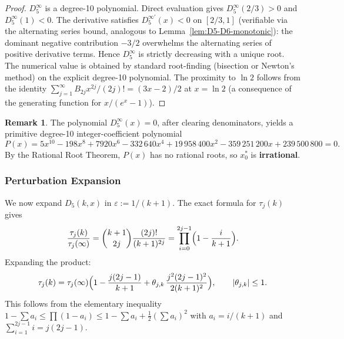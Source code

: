 \documentclass[12pt,a4paper]{article}
\theoremstyle{plain}
\theoremstyle{definition}
\newtheorem{remark}[theorem]{Remark}
\begin{document}
\begin{proof}
  $D_5^\infty$ is a degree-10 polynomial.  Direct evaluation gives
  $D_5^\infty(2/3) > 0$ and $D_5^\infty(1) < 0$.  The derivative
  satisfies $D_5^{\infty\prime}(x) < 0$ on $[2/3,1]$ (verifiable via
  the alternating series bound, analogous to Lemma~\ref{lem:D5-D6-monotonic}):
  the dominant negative contribution $-3/2$ overwhelms the alternating
  series of positive derivative terms.  Hence $D_5^\infty$ is strictly
  decreasing with a unique root.
  The numerical value is obtained by standard root-finding (bisection or
  Newton's method) on the explicit degree-10 polynomial.
  The proximity to $\ln 2$ follows from the identity
  $\sum_{j=1}^\infty B_{2j}x^{2j}/(2j)! = (3x-2)/2$
  at $x = \ln 2$ (a consequence of the generating function for
  $x/(e^x-1)$).
\end{proof}

\begin{remark}
  The polynomial $D_5^\infty(x) = 0$, after clearing denominators, yields
  a primitive degree-10 integer-coefficient polynomial
  \[
    P(x) = 5x^{10} - 198x^8 + 7920x^6 - 332\,640x^4
            + 19\,958\,400x^2 - 359\,251\,200x + 239\,500\,800 = 0.
  \]
  By the Rational Root Theorem, $P(x)$ has no rational roots, so
  $x_0^*$ is \textbf{irrational}.
\end{remark}

\subsubsection{Perturbation Expansion}
\label{sec:perturb}

We now expand $D_5(k,x)$ in $\varepsilon := 1/(k+1)$.  The exact formula
for $\tau_j(k)$ gives
\[
  \frac{\tau_j(k)}{\tau_j(\infty)}
  = \binom{k+1}{2j}\frac{(2j)!}{(k+1)^{2j}}
  = \prod_{i=0}^{2j-1}\Bigl(1 - \frac{i}{k+1}\Bigr).
\]
Expanding the product:
\begin{equation}\label{eq:tau-expand-new}
  \tau_j(k) = \tau_j(\infty)\Bigl(1 - \frac{j(2j-1)}{k+1}
              + \theta_{j,k}\,\frac{j^2(2j-1)^2}{2(k+1)^2}\Bigr),
  \qquad |\theta_{j,k}| \le 1.
\end{equation}
This follows from the elementary inequality
$1 - \sum a_i \le \prod(1-a_i) \le 1 - \sum a_i + \tfrac{1}{2}(\sum a_i)^2$
with $a_i = i/(k+1)$ and $\sum_{i=1}^{2j-1} i = j(2j-1)$.
\end{document}
